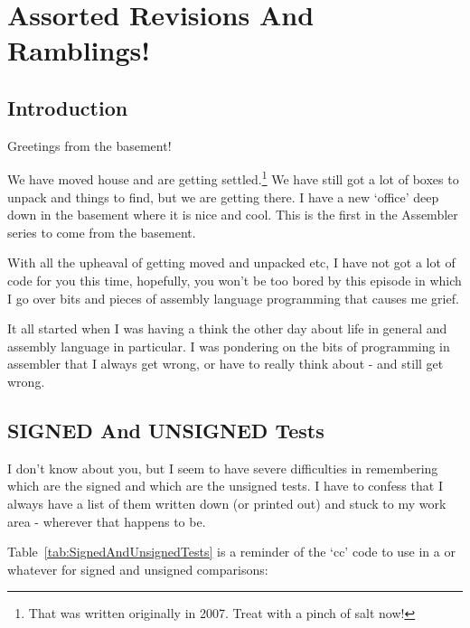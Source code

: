 \chapter{Assorted Revisions And Ramblings!}

\section{Introduction}
\label{ch19-intro}%

Greetings from the basement!

We have moved house and are getting settled.\footnote{That was written originally in 2007. Treat with a pinch of salt now!} We have still got a lot of
        boxes to unpack and things to find, but we are getting there. I have a new
        `office' deep down in the basement where it is nice and cool. This is the first in
        the Assembler series to come from the basement.

With all the upheaval of getting moved and unpacked etc, I have not got a
        lot of code for you this time, hopefully, you won't be too bored by this episode
        in which I go over bits and pieces of assembly language programming that causes me
        grief.

It all started when I was having a think the other day about life in general
        and assembly language in particular. I was pondering on the bits of programming in
        assembler that I always get wrong, or have to really think about -{} and still get
        wrong.

\section{SIGNED And UNSIGNED Tests}
\label{ch19-signed-unsigned}%

I don't know about you, but I seem to have severe difficulties in
        remembering which are the signed and which are the unsigned tests. I have to
        confess that I always have a list of them written down (or printed out) and stuck
        to my work area -{} wherever that happens to be.

Table~\ref{tab:SignedAndUnsignedTests} is a reminder of the `cc' code to use in a  or whatever for signed and unsigned comparisons:

